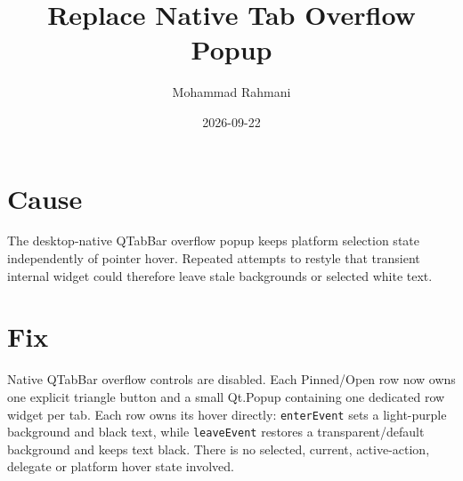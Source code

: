 \documentclass[a4paper]{article}
\title{Replace Native Tab Overflow Popup}
\date{2026-09-22}
\author{Mohammad Rahmani}
\begin{document}
   \maketitle

   \begin{preview}
      \section{Cause}
      The desktop-native QTabBar overflow popup keeps platform selection state
      independently of pointer hover. Repeated attempts to restyle that
      transient internal widget could therefore leave stale backgrounds or
      selected white text.

      \section{Fix}
      Native QTabBar overflow controls are disabled. Each Pinned/Open row now
      owns one explicit triangle button and a small Qt.Popup containing one
      dedicated row widget per tab. Each row owns its hover directly:
      \texttt{enterEvent} sets a light-purple background and black text, while
      \texttt{leaveEvent} restores a transparent/default background and keeps
      text black. There is no selected, current, active-action, delegate or
      platform hover state involved.
   \end{preview}

   
   
\end{document}

